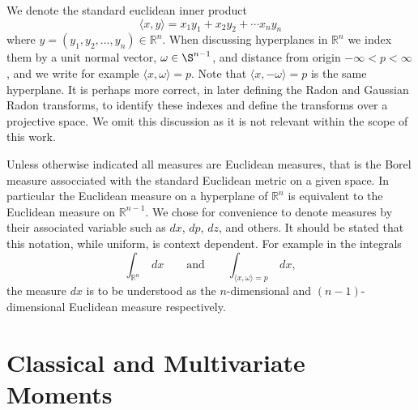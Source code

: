 \documentclass{amsart}
\theoremstyle{remark}
\numberwithin{equation}{section}
\newcommand{\RR}{\mathbb{R}}
\begin{document}
We denote the standard euclidean inner product
\[
    \langle x,y \rangle = x_1y_1 + x_2y_2 + \cdots x_ny_n
\]
where $y = (y_1, y_2, \ldots, y_n) \in \RR^n$. When discussing hyperplanes in $\RR^n$ we index them by a unit normal vector, $\omega \in \S^{n-1}$, and distance from origin $-\infty < p < \infty$, and we write for example $\langle x, \omega \rangle = p$. Note that $\langle x, -\omega \rangle = p$ is the same hyperplane. It is perhaps more correct, in later defining the Radon and Gaussian Radon transforms, to identify these indexes and define the transforms over a projective space. We omit this discussion as it is not relevant within the scope of this work.
\begin{figure}
\end{figure}

Unless otherwise indicated all measures are Euclidean measures, that is the Borel measure assocciated with the standard Euclidean metric on a given space. In particular the Euclidean measure on a hyperplane of $\RR^n$ is equivalent to the Euclidean measure on $\RR^{n-1}$. We chose for convenience to denote measures by their associated variable such as $dx$, $dp$, $dz$, and others. It should be stated that this notation, while uniform, is context dependent. For example in the integrals
\[
    \int_{\RR^n}~dx \qquad \text{and} \qquad \int_{\langle x, \omega\rangle = p} ~dx,
\]
the measure $dx$ is to be understood as the $n$-dimensional and $(n-1)$-dimensional Euclidean measure respectively.

\newpage
\section{Classical and Multivariate Moments}
\end{document}

